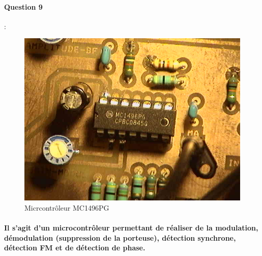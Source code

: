 \documentclass[french]{article}
\begin{document}
\paragraph{Question 9} : \\
\begin{figure}[!h]
\includegraphics[width=500px]{question9.jpg}
\caption{Micrcontrôleur MC1496PG}
\end{figure}
\paragraph{Il s'agit d'un microcontrôleur permettant de réaliser de la modulation, démodulation (suppression de la porteuse), détection synchrone, détection FM et de détection de phase. }
\end{document}
